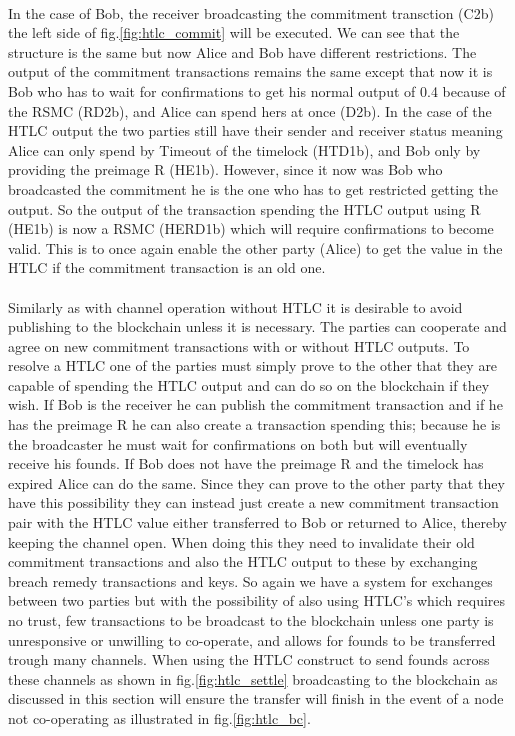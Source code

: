 \documentclass[informationsecurity]{gucmasterproject}
\begin{document}
\paragraph{}
In the case of Bob, the receiver broadcasting the commitment transction (C2b) the left side of fig.\ref{fig:htlc_commit} will be executed. We can see that the structure is the same but now Alice and Bob have different restrictions. The output of the commitment transactions remains the same except that now it is Bob who has to wait for confirmations to get his normal output of 0.4 because of the RSMC (RD2b), and Alice can spend hers at once (D2b). In the case of the HTLC output the two parties still have their sender and receiver status meaning Alice can only spend by Timeout of the timelock (HTD1b), and Bob only by providing the preimage R (HE1b). However, since it now was Bob who broadcasted the commitment he is the one who has to get restricted getting the output. So the output of the transaction spending the HTLC output using R (HE1b) is now a RSMC (HERD1b) which will require confirmations to become valid. This is to once again enable the other party (Alice) to get the value in the HTLC if the commitment transaction is an old one.  

\paragraph{}
Similarly as with channel operation without HTLC it is desirable to avoid publishing to the blockchain unless it is necessary. The parties can cooperate and agree on new commitment transactions with or without HTLC outputs. To resolve a HTLC one of the parties must simply prove to the other that they are capable of spending the HTLC output and can do so on the blockchain if they wish. If Bob is the receiver he can publish the commitment transaction and if he has the preimage R he can also create a transaction spending this; because he is the broadcaster he must wait for confirmations on both but will eventually receive his founds. If Bob does not have the preimage R and the timelock has expired Alice can do the same. Since they can prove to the other party that they have this possibility they can instead just create a new commitment transaction pair with the HTLC value either transferred to Bob or returned to Alice, thereby keeping the channel open. When doing this they need to invalidate their old commitment transactions and also the HTLC output to these by exchanging breach remedy transactions and keys. So again we have a system for exchanges between two parties but with the possibility of also using HTLC's which requires no trust, few transactions to be broadcast to the blockchain unless one party is unresponsive or unwilling to co-operate, and allows for founds to be transferred trough many channels.  
When using the HTLC construct to send founds across these channels as shown in fig.\ref{fig:htlc_settle} broadcasting to the blockchain as discussed in this section will ensure the transfer will finish in the event of a node not co-operating as illustrated in fig.\ref{fig:htlc_bc}.
\end{document}

